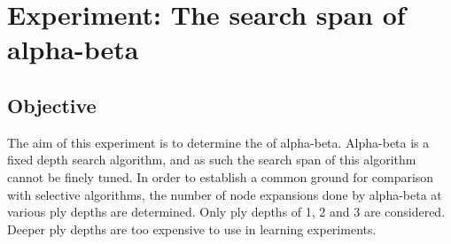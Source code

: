 \section{Experiment: The search span of alpha-beta} 
\label{sec:tree-exp-ab-span}
\subsection*{Objective} 
The aim of this experiment is to determine the  of alpha-beta.  Alpha-beta is a fixed depth search algorithm, and as such the search span of this algorithm cannot be finely tuned.  In order to establish a common ground for comparison with selective algorithms, the number of node expansions done by alpha-beta at various ply depths are determined. Only ply depths of 1, 2 and 3 are considered.  Deeper ply depths are too expensive to use in learning experiments.  
   
